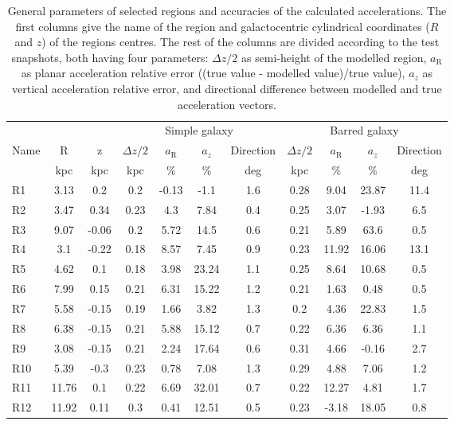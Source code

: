 \documentclass[fleqn,usenatbib]{mnras}
\begin{document}
    	\begin{table*}
		\caption{General parameters of selected regions and accuracies of the calculated accelerations. The first columns give the name of the region and galactocentric cylindrical coordinates ($R$ and $z$) of the regions centres. The rest of the columns are divided according to the test snapshots, both having four parameters: $\Delta z/2$ as semi-height of the modelled region,  $a_\text{R}$ as planar acceleration relative error ((true value - modelled value)/true value), $a_z$ as vertical acceleration relative error, and directional difference between modelled and true acceleration vectors. }\label{tab:regions}
		\begin{tabular}{lcc|cccc|cccc}
\hline\hline
			& & & \multicolumn{4}{c|}{Simple galaxy} & \multicolumn{4}{c}{Barred galaxy} \\
			\!\!Name\!\!  &  R  & z &  \multicolumn{1}{c}{$\Delta z/2$} & \multicolumn{1}{c}{$a_\text{R}$}  &  \multicolumn{1}{c}{$a_z$} &   \multicolumn{1}{c|}{\!\!Direction\!\!} & \multicolumn{1}{c}{$\Delta z/2$} & \multicolumn{1}{c}{$a_\text{R}$}  &  \multicolumn{1}{c}{$a_z$} &   \multicolumn{1}{c}{\!\!Direction\!\!} \\
			\hline
			 & kpc &  kpc  & kpc &  \% & \% & deg & kpc &  \% & \% & deg \\
			\hline
R1 &  3.13  &  0.2  &  0.2  &  -0.13  &  -1.1  &  1.6  &  0.28  &  9.04  &  23.87  &  11.4 \\ 
R2 &  3.47  &  0.34  &  0.23  &  4.3  &  7.84  &  0.4  &  0.25  &  3.07  &  -1.93  &  6.5 \\ 
R3 &  9.07  &  -0.06  &  0.2  &  5.72  &  14.5  &  0.6  &  0.21  &  5.89  &  63.6  &  0.5 \\ 
R4 &  3.1  &  -0.22  &  0.18  &  8.57  &  7.45  &  0.9  &  0.23  &  11.92  &  16.06  &  13.1 \\ 
R5 &  4.62  &  0.1  &  0.18  &  3.98  &  23.24  &  1.1  &  0.25  &  8.64  &  10.68  &  0.5 \\ 
R6 &  7.99  &  0.15  &  0.21  &  6.31  &  15.22  &  1.2  &  0.21  &  1.63  &  0.48  &  0.5 \\ 
R7 &  5.58  &  -0.15  &  0.19  &  1.66  &  3.82  &  1.3  &  0.2  &  4.36  &  22.83  &  1.5 \\ 
R8 &  6.38  &  -0.15  &  0.21  &  5.88  &  15.12  &  0.7  &  0.22  &  6.36  &  6.36  &  1.1 \\ 
R9 &  3.08  &  -0.15  &  0.21  &  2.24  &  17.64  &  0.6  &  0.31  &  4.66  &  -0.16  &  2.7 \\ 
R10 &  5.39  &  -0.3  &  0.23  &  0.78  &  7.08  &  1.3  &  0.29  &  4.88  &  7.06  &  1.2 \\ 
R11 &  11.76  &  0.1  &  0.22  &  6.69  &  32.01  &  0.7  &  0.22  &  12.27  &  4.81  &  1.7 \\ 
R12 &  11.92  &  0.11  &  0.3  &  0.41  &  12.51  &  0.5  &  0.23  &  -3.18  &  18.05  &  0.8 \\ 
\hline
		\end{tabular}
	\end{table*}
\end{document}
